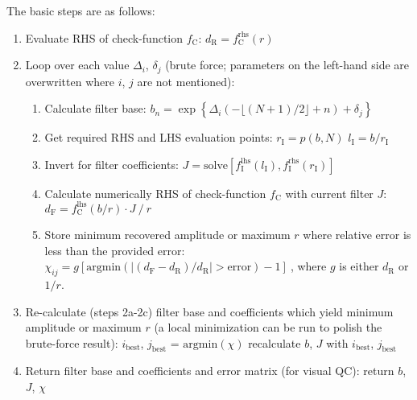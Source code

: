 \documentclass[paper,twocolumn,twoside]{geophysics}
\newcommand{\mr}[1]{\mathrm{#1}}
\begin{document}
The basic steps are as follows:
\begin{enumerate}
  \item Evaluate RHS of check-function $f_\mr{C}$:\newline
    $d_\mr{R} = f_\mr{C}^\mr{rhs}(r)$
  \item Loop over each value $\Delta_i$, $\delta_j$ (brute force;
      parameters on the left-hand side are overwritten where $i$, $j$
      are not mentioned):
    \begin{enumerate}
      \item Calculate filter base:\newline
        $b_n = \exp\left\{\Delta_i(-\lfloor{(N+1)/2\rfloor}+n) +
      \delta_j\right\}$
      \item Get required RHS and LHS evaluation points:\newline
        $r_\mr{I} = p(b, N)$\newline
        $l_\mr{I} = b/r_\mr{I}$
      \item Invert for filter coefficients:\newline
        $J = \mr{solve}\left[f_\mr{I}^\mr{lhs}(l_\mr{I}),
        f_\mr{I}^\mr{rhs}(r_\mr{I})\right]$
    \item Calculate numerically RHS of check-function $f_\mr{C}$ with current
      filter $J$:\newline
      $d_\mr{F} = f_\mr{C}^\mr{lhs}(b/r)\cdot J\ /\ r$
      \item Store minimum recovered amplitude or maximum $r$ where relative
        error is less than the provided error:\newline
        $\chi_{ij} = g\left[
        \mr{argmin}\left(|(d_\mr{F}-d_\mr{R})/d_\mr{R}| >
        \mr{error}\right) -1\right]\ $, where $g$ is either $d_\mr{R}$
        or $1/r$.
    \end{enumerate}
  \item Re-calculate (steps 2a-2c) filter base and
    coefficients which yield minimum amplitude or maximum $r$ (a local
    minimization can be run to polish the brute-force result):\newline
    $i_\mr{best}$, $j_\mr{best}$ = $\mr{argmin}(\chi)$\newline
    recalculate $b$, $J$ with $i_\mr{best}$, $j_\mr{best}$\newline
    \newline
  \item Return filter base and coefficients and error matrix (for visual
    QC):\newline
    return $b$, $J$, $\chi$\newline
\end{enumerate}
\end{document}
